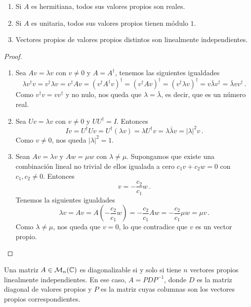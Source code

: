 \begin{theo}
  \begin{enumerate}
    \item Si $A$ es hermitiana, todos sus valores propios son reales.
    \item Si $A$ es unitaria, todos sus valores propios tienen módulo $1$.
    \item Vectores propios de valores propios distintos son linealmente independientes.
  \end{enumerate}
\end{theo}
\begin{proof}
  \begin{enumerate}
    \item Sea $Av=\lambda v$ con $v\neq 0$ y $A=A^\dagger$, tenemos las siguientes igualdades
          \[
            \lambda v^\dagger v = v^\dagger\lambda v = v^\dagger Av = (v^\dagger A^\dagger v)^\dagger = (v^\dagger A v)^\dagger = (v^\dagger \lambda v)^\dagger = v \bar{\lambda } v^\dagger = \bar{\lambda }v v^\dagger\,.
          \]
          Como $v^\dagger v = v v^\dagger$ y no nulo, nos queda que $\lambda=\bar{\lambda}$, es decir, que es un número real.

    \item Sea $Uv=\lambda v$ con $v\neq 0$ y $UU^\dagger=I$. Entonces
          \[
            Iv = U^\dagger U v = U^\dagger (\lambda v) = \lambda U^\dagger v  = \lambda \bar{\lambda} v = |\lambda|^2 v\,.
          \]
          Como $v\neq 0$, nos queda $|\lambda|^2=1$.

    \item Sean $Av=\lambda v$ y $Aw=\mu w$ con $\lambda\neq\mu$. Supongamos que existe una combinación lineal no trivial de ellos igualada a cero $c_1 v + c_2 w = 0$ con $c_1,c_2\neq 0$. Entonces
          \[
            v = -\frac{c_2}{c_1} w\,.
          \]
          Tenemos la siguientes igualdades
          \[
            \lambda v = A v = A \left( -\frac{c_2}{c_1} w \right) = -\frac{c_2}{c_1} A w = -\frac{c_2}{c_1} \mu w = \mu v\,.
          \]
          Como $\lambda\neq\mu$, nos queda que $v=0$, lo que contradice que $v$ es un vector propio.
  \end{enumerate}
\end{proof}

\begin{theo}[Diagonalización]
  Una matriz $A\in\mathcal{M}_n(\mathbb{C})$ es diagonalizable si y solo si tiene $n$ vectores propios linealmente independientes. En ese caso, $A=PDP^{-1}$, donde $D$ es la matriz diagonal de valores propios y $P$ es la matriz cuyas columnas son los vectores propios correspondientes.
\end{theo}

